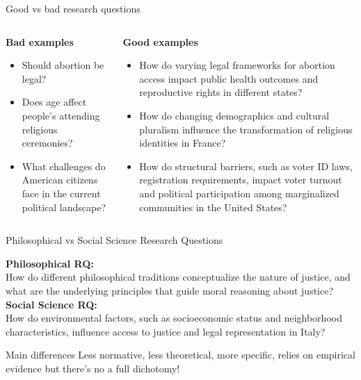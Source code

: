 \documentclass[10pt, aspectratio=169]{beamer}
\begin{document}
\begin{frame}{Good vs bad research questions}
\begin{columns}
    \begin{column}{0.3\textwidth}
        \begin{center}
            \textbf{Bad examples}
        \end{center}
        \begin{itemize}
            \item Should abortion be legal? 
            \item Does age affect people's attending religious ceremonies? 
            \item What challenges do American citizens face in the current political landscape?
        \end{itemize}
    \end{column}
    \vline
    \begin{column}{0.7\textwidth}
        \begin{center}
            \textbf{Good examples}
        \end{center}
        \begin{itemize}
            \item How do varying legal frameworks for abortion access impact public health outcomes and reproductive rights in different states?
            \item How do changing demographics and cultural pluralism influence the transformation of religious identities in France?
            \item How do structural barriers, such as voter ID laws, registration requirements, impact voter turnout and political participation among marginalized communities in the United States?
        \end{itemize}
    \end{column}
\end{columns}
\end{frame}

\begin{frame}{Philosophical vs Social Science Research Questions}

\textbf{Philosophical RQ:} \\
\vspace{0.3cm}
How do different philosophical traditions conceptualize the nature of justice, and what are the underlying principles that guide moral reasoning about justice? \\
\vspace{0.3cm}
\textbf{Social Science RQ:} \\
\vspace{0.3cm}
How do environmental factors, such as socioeconomic status and neighborhood characteristics, influence access to justice and legal representation in Italy?
\vspace{0.3cm}
\begin{block}{Main differences}
Less normative, less theoretical, more specific, relies on empirical evidence but there's no a full dichotomy!
\end{block}
 
\end{frame}
\end{document}
